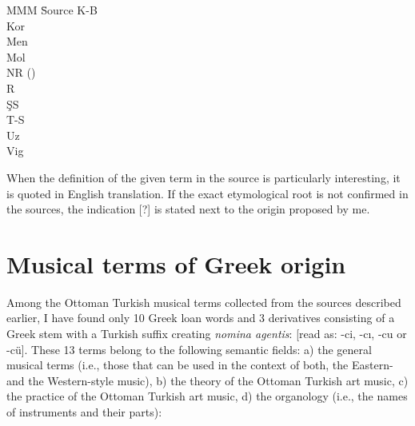 \documentclass[output=paper,colorlinks,citecolor=brown,arabicfont,chinesefont]{langscibook}
\begin{document}
\begin{multicols}{2}
\begin{tabbing}
MMM \= Source\kill
K-B \> \citealt{KiefferBianchi1835}\\
Kor \> \citealt{Korabinsky1788}\\
Men \> \citealt{Meninski1680}\\
Mol \> \citealt{Siemieniec-golas2005}\\
NR  \>  (\citeyear{RedhouseSozlugu2017})\\
R   \> \citealt{Redhouse1861}\\
ŞS  \> \citealt{Sami1885}\\
T-S \> \citealt{TinghirSinapian1891}\\
Uz  \> \citealt{Uz1892}\\
Vig \> \citealt{Stachowski2002}
\end{tabbing}
\end{multicols}

When the definition of the given term in the source is particularly interesting, it is quoted in English translation. If the exact etymological root is not confirmed in the sources, the indication [?] is stated next to the origin proposed by me.

\section{Musical terms of Greek origin}\label{sec:pawlina:3}

Among the Ottoman Turkish musical terms collected from the sources described earlier, I have found only 10 Greek loan words and 3 derivatives consisting of a Greek stem with a Turkish suffix creating \emph{nomina agentis}: {} [read as: -ci, -cı, -cu or -cü]. These 13 terms belong to the following semantic fields: a) the general musical terms (i.e., those that can be used in the context of both, the Eastern- and the Western-style music), b) the theory of the Ottoman Turkish art music, c) the practice of the Ottoman Turkish art music, d) the organology (i.e., the names of instruments and their parts):
\end{document}
